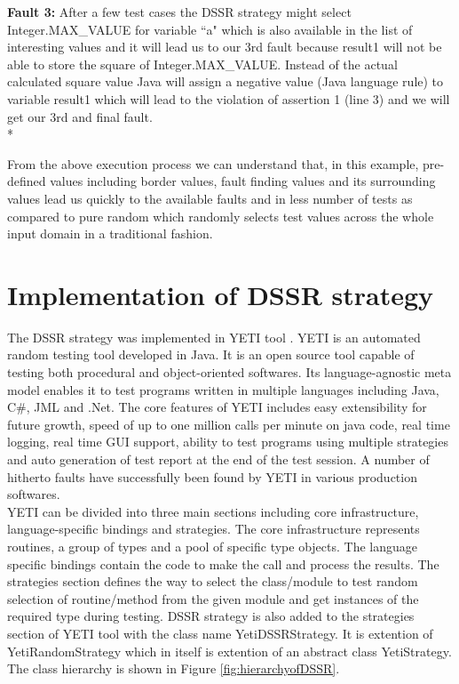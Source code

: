 \textbf{Fault 3:} After a few test cases the DSSR strategy might select Integer.MAX\_VALUE for variable ``a" which is also available in the list of interesting values and it will lead us to our 3rd fault because result1 will not be able to store the square of Integer.MAX\_VALUE. Instead of the actual calculated square value Java will assign a negative value (Java language rule) to variable result1 which will lead to the violation of assertion 1 (line 3) and we will get our 3rd and final fault.\\*


From the above execution process we can understand that, in this example, pre-defined values including border values, fault finding values and its surrounding values lead us quickly to the available faults and in less number of tests as compared to pure random which randomly selects test values across the whole input domain in a traditional fashion.

\section{Implementation of DSSR strategy}

The DSSR strategy was implemented in YETI tool \cite{Oriol2011}. YETI is an automated random testing tool developed in Java. It is an open source tool capable of testing both procedural and object-oriented softwares. Its language-agnostic meta model enables it to test programs written in multiple languages including Java, C\#, JML and .Net. The core features of YETI includes easy extensibility for future growth, speed of up to one million calls per minute on java code, real time logging, real time GUI support, ability to test programs using multiple strategies and auto generation of test report at the end of the test session. A number of hitherto faults have successfully been found by YETI in various production softwares. \\

YETI can be divided into three main sections including core infrastructure, language-specific bindings and strategies. The core infrastructure represents routines, a group of types and a pool of specific type objects. The  language specific bindings contain the code to make the call and process the results. The strategies section defines the way to select the class/module to test random selection of routine/method from the given module and get instances of the required type during testing. DSSR strategy is also added to the strategies section of YETI tool with the class name YetiDSSRStrategy. It is extention of YetiRandomStrategy which in itself is extention of an abstract class YetiStrategy. The class hierarchy is shown in Figure \ref{fig:hierarchyofDSSR}.\\

